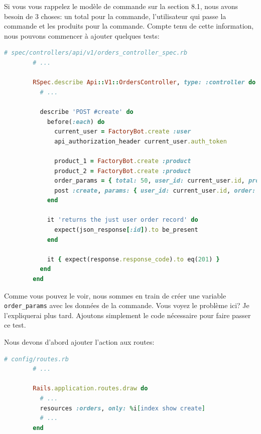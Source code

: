 \documentclass[]{report}
\begin{document}
      Si vous vous rappelez le modèle de commande sur la section 8.1, nous avons besoin de 3 choses: un total pour la commande, l'utilisateur qui passe la commande et les produits pour la commande. Compte tenu de cette information, nous pouvons commencer à ajouter quelques tests:

      \begin{scriptsize}
        \begin{lstlisting}[language=ruby, caption={Création de tests pour la création d'une commande}]
        # spec/controllers/api/v1/orders_controller_spec.rb
        # ...

        RSpec.describe Api::V1::OrdersController, type: :controller do
          # ...

          describe 'POST #create' do
            before(:each) do
              current_user = FactoryBot.create :user
              api_authorization_header current_user.auth_token

              product_1 = FactoryBot.create :product
              product_2 = FactoryBot.create :product
              order_params = { total: 50, user_id: current_user.id, product_ids: [product_1.id, product_2.id] }
              post :create, params: { user_id: current_user.id, order: order_params }
            end

            it 'returns the just user order record' do
              expect(json_response[:id]).to be_present
            end

            it { expect(response.response_code).to eq(201) }
          end
        end
        \end{lstlisting}
      \end{scriptsize}

      Comme vous pouvez le voir, nous sommes en train de créer une variable \verb|order_params| avec les données de la commande. Vous voyez le problème ici? Je l'expliquerai plus tard. Ajoutons simplement le code nécessaire pour faire passer ce test.

      Nous devons d'abord ajouter l'action aux routes:

      \begin{scriptsize}
        \begin{lstlisting}[language=ruby]
        # config/routes.rb
        # ...

        Rails.application.routes.draw do
          # ...
          resources :orders, only: %i[index show create]
          # ...
        end
        \end{lstlisting}
      \end{scriptsize}
\end{document}

